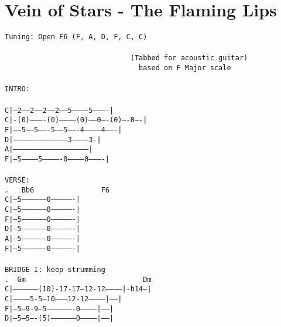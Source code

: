 \newpage
\section{Vein of Stars - The Flaming Lips}
\label{Vein of Stars - The Flaming Lips}
\texttt{Tuning:\ Open\ F6\ (F,\ A,\ D,\ F,\ C,\ C)\\
\\
\ \ \ \ \ \ \ \ \ \ \ \ \ \ \ \ \ \ \ \ \ \ \ \ \ \ \ \ \ \ (Tabbed\ for\ acoustic\ guitar)\\
\ \ \ \ \ \ \ \ \ \ \ \ \ \ \ \ \ \ \ \ \ \ \ \ \ \ \ \ \ \ \ \ based\ on\ F\ Major\ scale\\
\\
INTRO:\\
\\
C|--2-----2------2------2------5------------5----------|\\
C|-(0)----------(0)-----------(0)-----0----(0)----0----|\\
F|-----5-----5-------5-----5-------4-----------4-------|\\
D|---------------------------------------3-----------3-|\\
A|-----------------------------------------------------|\\
F|--5------------5-------------0------------0----------|\\
\\
VERSE:\\
.\ \ \ Bb6\ \ \ \ \ \ \ \ \ \ \ \ \ \ \ \ F6\\
C|--5------------------0----------------|\\
C|--5------------------0----------------|\\
F|--5------------------0----------------|\\
D|--5------------------0----------------|\\
A|--5------------------0----------------|\\
F|--5------------------0----------------|\\
\\
BRIDGE\ I:\ keep\ strumming\\
.\ \ Gm\ \ \ \ \ \ \ \ \ \ \ \ \ \ \ \ \ \ \ \ \ \ \ \ \ \ \ \ Dm\\
C|-----------------(10)-17-17--12-12-----------|-h14--|\\
C|------------5-5---10---------12-12-----------|------|\\
F|--5---9-9---5-------------------0------------|------|\\
D|--5---5----(5)------------------0------------|------|\\
}
